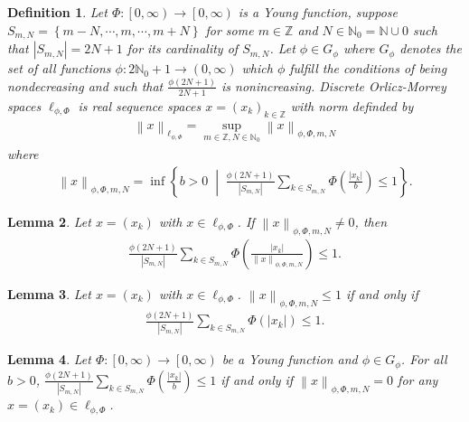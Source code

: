 \documentclass[12pt,a4paper]{article}
\newtheorem{definition}{Definition}[section]
\newtheorem{lemma}[definition]{Lemma}
\theoremstyle{remark}
\begin{document}
\begin{definition}
    \cite{ref7} Let $\Phi : \left[0, \infty\right) \rightarrow \left[0, \infty\right)$ is a Young function, suppose $S_{m,N}=\left\{m-N,\cdots,m,\cdots,m+N\right\}$ for some $m\in\mathbb{Z}$ and $N\in\mathbb{N}_0=\mathbb{N}\cup 0$ such that $\left|S_{m,N}\right|=2N+1$ for its cardinality of $S_{m,N}$. Let $\phi\in G_\phi$ where $G_\phi$ denotes the set of all functions $\phi : 2\mathbb{N}_0 +1 \rightarrow (0, \infty)$ which $\phi$ fulfill the conditions of being nondecreasing and such that $\frac{\phi\left(2N+1\right)}{2N+1}$ is nonincreasing. Discrete Orlicz-Morrey spaces $\ell_{\phi,\Phi}$ is real sequence spaces $x=\left(x_k\right)_{k\in\mathbb{Z}}$ with norm definded by 
    \begin{eqnarray*}
        \left\lVert x\right\rVert _{\ell_{\phi,\Phi}} =\sup_{m\in\mathbb{Z}, N\in\mathbb{N}_0} \left\lVert x\right\rVert _{\phi,\Phi, m, N}
    \end{eqnarray*}
    where
    \begin{eqnarray*}
        \left\lVert x\right\rVert _{\phi,\Phi, m, N} = \inf \left\{b>0 \;\middle|\; \frac{\phi\left(2N+1\right)}{\left|S_{m,N}\right|}\sum_{k\in S_{m,N}}\Phi\left(\frac{\left|x_k\right|}{b}\right) \leq 1\right\}.
    \end{eqnarray*}
\end{definition}

\begin{lemma}
    \cite{ref7} Let $x=\left(x_k\right)$ with $x\in\ell_{\phi,\Phi}$. If  $\left\lVert x\right\rVert _{\phi,\Phi,m,N}\ne 0$, then 
    \begin{eqnarray*}
        \frac{\phi\left(2N+1\right)}{\left|S_{m,N}\right|}\sum_{k\in S_{m,N}}\Phi\left(\frac{\left|x_k\right|}{\left\lVert x\right\rVert _{\phi,\Phi,m,N}}\right)\leq1.
    \end{eqnarray*}
\end{lemma}
 
\begin{lemma}
    \cite{ref7} Let $x=\left(x_k\right)$ with $x\in\ell_{\phi,\Phi}$. $\left\lVert x\right\rVert _{\phi,\Phi,m,N}\leq 1$ if and only if 
    \begin{eqnarray*}
        \frac{\phi\left(2N+1\right)}{\left|S_{m,N}\right|}\sum_{k\in S_{m,N}}\Phi\left(\left|x_k\right|\right)\leq1.
    \end{eqnarray*}
\end{lemma} 

\begin{lemma}
    \cite{ref7} Let $\Phi : \left[0, \infty\right) \rightarrow \left[0, \infty\right)$ be a Young function and $\phi\in G_\phi$. For all $b>0$, $\frac{\phi\left(2N+1\right)}{\left|S_{m,N}\right|}\sum_{k\in S_{m,N}}\Phi\left(\frac{\left|x_k\right|}{b}\right)\leq1$ if and only if $\left\lVert x\right\rVert _{\phi,\Phi,m,N}=0$ for any $x=\left(x_k\right)\in\ell_{\phi,\Phi}$.
\end{lemma}
\end{document}
